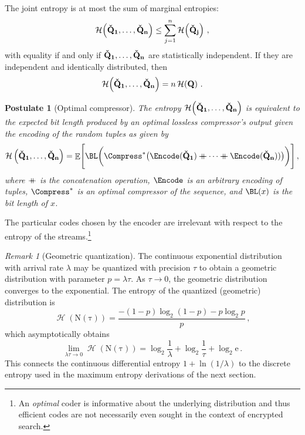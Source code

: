 \documentclass[final,11pt]{article}
\newcommand{\rvhtup}[1][]{%
   \ifthenelse{ \equal{#1}{} }
      {\ensuremath{\rv{\vec{\check{Q}}}}}
      {\ensuremath{\rv{\vec{\check{Q}_{#1}}}}}
}
\newcommand{\rv}[1]{\mathrm{#1}}
\newcommand{\entropy}{\operatorname{\mathcal{H}}}
\renewcommand{\vec}[1]{\boldsymbol{\mathbf{#1}}}
\newcommand\concatop{\mathbin{+\mkern-10mu+}}
\DeclareMathOperator{\expectation}{\mathbb{E}}
\numberwithin{equation}{section}
\theoremstyle{plain}
\newtheorem{postulate}{Postulate}[section]
\theoremstyle{remark}
\newtheorem*{remark}{Remark}
\begin{document}
The joint entropy is at most the sum of marginal entropies:
\begin{equation}
    \entropy\!\left(\rvhtup[1], \ldots, \rvhtup[n]\right) \leq \sum_{j=1}^{n} \entropy\!\left(\rvhtup[j]\right)\,,
\end{equation}
with equality if and only if $\rvhtup[1], \ldots, \rvhtup[n]$ are statistically independent. If they are independent and identically distributed, then
\begin{equation}
    \entropy\!\left(\rvhtup[1], \ldots, \rvhtup[n]\right) = n \entropy\!\left(\rv{\vec{Q}}\right)\,.
\end{equation}

\begin{postulate}[Optimal compressor]
\label{post:optcomp}
The \emph{entropy} $\entropy\!\left(\rvhtup[1], \ldots, \rvhtup[n]\right)$ is equivalent to the \emph{expected} bit length produced by an optimal \emph{lossless} compressor's output given the encoding of the random tuples as given by
\begin{equation}
    \entropy\left(\rvhtup[1],\ldots,\rvhtup[n]\right) =
    \expectation\Biggl[
        \BL\biggl(
            \Compress^*\bigl(
                \Encode(\rvhtup[1]) \concatop \cdots \concatop \Encode(\rvhtup[n])
                )
            \bigr)
        \biggr)
    \Biggr]\,,
\end{equation}
where $\concatop$ is the concatenation operation, $\Encode$ is an arbitrary encoding of tuples, $\Compress^*$ is an optimal compressor of the sequence, and $\BL(x)$ is the bit length of $x$.
\end{postulate}
The particular codes chosen by the encoder are irrelevant with respect to the entropy of the streams.\footnote{An \emph{optimal} coder is informative about the underlying distribution and thus efficient codes are not necessarily even sought in the context of encrypted search.}

\begin{remark}[Geometric quantization]
The continuous exponential distribution with arrival rate $\lambda$ may be quantized with precision $\tau$ to obtain a geometric distribution with parameter $p = \lambda \tau$. As $\tau \to 0$, the geometric distribution converges to the exponential. The entropy of the quantized (geometric) distribution is
\begin{equation}
    \entropy(\rv{N(\tau)}) = \frac{-(1-p)\log_2(1-p)- p\log_2 p}{p}\,,
\end{equation}
which asymptotically obtains
\begin{equation}
    \lim_{\lambda \tau \to 0} \entropy(\rv{N(\tau)}) = \log_2 \frac{1}{\lambda} + \log_2 \frac{1}{\tau} + \log_2 \mathrm{e}\,.
\end{equation}
This connects the continuous differential entropy $1 + \ln(1/\lambda)$ to the discrete entropy used in the maximum entropy derivations of the next section.
\end{remark}
\end{document}
